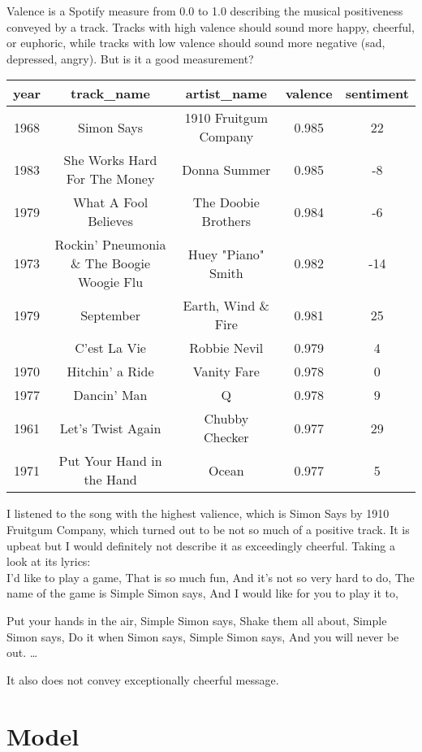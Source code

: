\documentclass[]{article}
\begin{document}
Valence is a Spotify measure from 0.0 to 1.0 describing the musical
positiveness conveyed by a track. Tracks with high valence should sound
more happy, cheerful, or euphoric, while tracks with low valence should
sound more negative (sad, depressed, angry). But is it a good
measurement?

\begin{table}[H]
\centering
\begin{tabular}{ccccc}
\toprule
year & track\_name & artist\_name & valence & sentiment\\
\midrule
1968 & Simon Says & 1910 Fruitgum Company & 0.985 & 22\\
1983 & She Works Hard For The Money & Donna Summer & 0.985 & -8\\
1979 & What A Fool Believes & The Doobie Brothers & 0.984 & -6\\
1973 & Rockin' Pneumonia \& The Boogie Woogie Flu & Huey "Piano" Smith & 0.982 & -14\\
1979 & September & Earth, Wind \& Fire & 0.981 & 25\\
\addlinespace
1987 & C'est La Vie & Robbie Nevil & 0.979 & 4\\
1970 & Hitchin' a Ride & Vanity Fare & 0.978 & 0\\
1977 & Dancin' Man & Q & 0.978 & 9\\
1961 & Let's Twist Again & Chubby Checker & 0.977 & 29\\
1971 & Put Your Hand in the Hand & Ocean & 0.977 & 5\\
\bottomrule
\end{tabular}
\end{table}

I listened to the song with the highest valience, which is Simon Says by
1910 Fruitgum Company, which turned out to be not so much of a positive
track. It is upbeat but I would definitely not describe it as
exceedingly cheerful. Taking a look at its lyrics:\\
I'd like to play a game, That is so much fun, And it's not so very hard
to do, The name of the game is Simple Simon says, And I would like for
you to play it to,

Put your hands in the air, Simple Simon says, Shake them all about,
Simple Simon says, Do it when Simon says, Simple Simon says, And you
will never be out. \ldots{}

It also does not convey exceptionally cheerful message.

\hypertarget{model}{%
\section{Model}\label{model}}
\end{document}
